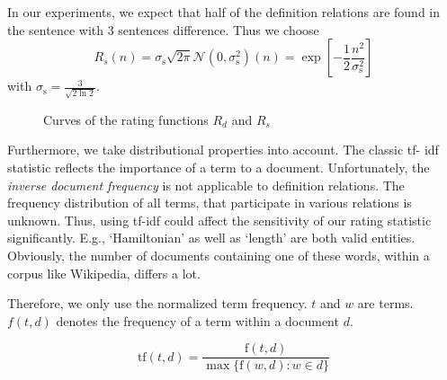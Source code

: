 \documentclass[runningheads]{llncs}
\begin{document}
In our experiments, we expect that half of the definition relations are found
in the sentence with 3 sentences difference. Thus we choose
\begin{equation}
\label{eq:order}
R_{s}(n)={\sigma_\mathrm{s} \sqrt{2\pi}} \mathcal N(0,\sigma_\mathrm{s}^2)(n)= \exp\left[-\frac{1}{2}\frac{n^2}{\sigma_\mathrm{s}^2}\right]
\end{equation}
 with $\sigma_\mathrm{s}=\frac{3}{\sqrt{2\ln 2}}$.
\newcommand{\normalPlotFWHMII}[2]{(e^((-1/2)*(((#1)^2*2*ln(2))/(#2)^2)))}

\begin{figure}[H]
\caption{Curves of the rating functions $R_{d}$ and $R_{s}$}
\end{figure}

Furthermore, we take distributional properties into account. The classic tf-
idf \cite{Salton86} statistic reflects the importance of a term to a document.
Unfortunately, the \emph{inverse document frequency} is not applicable to
definition relations. The frequency distribution of all terms, that
participate in various relations is unknown. Thus, using tf-idf could affect
the sensitivity of our rating statistic significantly. E.g., `Hamiltonian' as
well as `length' are both valid entities. Obviously, the number of documents
containing one of these words, within a corpus like Wikipedia, differs a lot.

Therefore, we only use the normalized term frequency. $t$ and $w$ are terms.
$f(t,d)$ denotes the frequency of a term within a document $d$.

\begin{equation}
	\label{eq:tf}
	\mathrm{tf}(t,d) = \frac{\mathrm{f}(t,d)}{\max\{\mathrm{f}(w,d):w \in d\}}
\end{equation}
\end{document}
